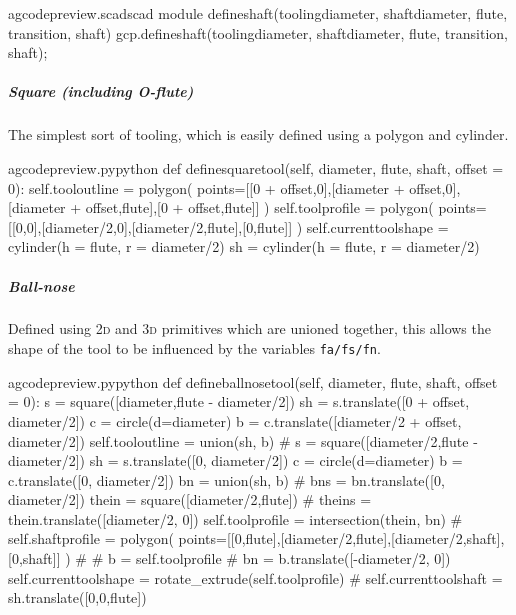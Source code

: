 \documentclass{ltxdoc}
\begin{document}
\lstset{firstnumber=\thegcpscad}
\begin{writecode}{a}{gcodepreview.scad}{scad}
module defineshaft(toolingdiameter, shaftdiameter, flute, transition, shaft){
    gcp.defineshaft(toolingdiameter, shaftdiameter, flute, transition, shaft);
}

\end{writecode}
\addtocounter{gcpscad}{4}

\subparagraph{Square (including O-flute)}

The simplest sort of tooling, which is easily defined using a polygon and cylinder.

\lstset{firstnumber=\thegcpy}
\begin{writecode}{a}{gcodepreview.py}{python}
    def definesquaretool(self, diameter, flute, shaft, offset = 0):
        self.tooloutline = polygon( points=[[0 + offset,0],[diameter + offset,0],[diameter + offset,flute],[0 + offset,flute]] )
        self.toolprofile = polygon( points=[[0,0],[diameter/2,0],[diameter/2,flute],[0,flute]] )
        self.currenttoolshape = cylinder(h = flute, r = diameter/2)
        sh = cylinder(h = flute, r = diameter/2)

\end{writecode}
\addtocounter{gcpy}{6}

\subparagraph{Ball-nose}

Defined using \textsc{2d} and \textsc{3d} primitives which are unioned together, this allows the shape of the tool to be influenced by the variables \verb|fa/fs/fn|.

\lstset{firstnumber=\thegcpy}
\begin{writecode}{a}{gcodepreview.py}{python}
    def defineballnosetool(self, diameter, flute, shaft, offset = 0):
        s = square([diameter,flute - diameter/2])
        sh = s.translate([0 + offset, diameter/2])
        c = circle(d=diameter)
        b = c.translate([diameter/2 + offset, diameter/2])
        self.tooloutline = union(sh, b)
#
        s = square([diameter/2,flute - diameter/2])
        sh = s.translate([0, diameter/2])
        c = circle(d=diameter)
        b = c.translate([0, diameter/2])
        bn = union(sh, b)
#        bns = bn.translate([0, diameter/2])
        thein = square([diameter/2,flute])
#        theins = thein.translate([diameter/2, 0])
        self.toolprofile = intersection(thein, bn)
#
        self.shaftprofile = polygon( points=[[0,flute],[diameter/2,flute],[diameter/2,shaft],[0,shaft]] )
#
#        b = self.toolprofile
#        bn = b.translate([-diameter/2, 0])
        self.currenttoolshape = rotate_extrude(self.toolprofile)
#
        self.currenttoolshaft = sh.translate([0,0,flute])

\end{writecode}
\addtocounter{gcpy}{25}
\end{document}
